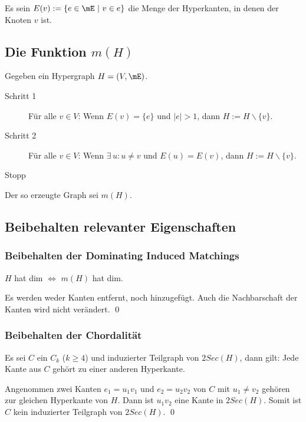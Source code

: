Es sein $E(v):=\{e\in \mE \ |\ v\in e\}$ die Menge der Hyperkanten, in denen der Knoten $v$ ist.

\subsection{Die Funktion $m(H)$}
Gegeben ein Hypergraph $H=(V,\mE)$.
\begin{description}
\item[Schritt 1] Für alle $v\in V$: Wenn $E(v)=\{e\}$ und $|e|>1$, dann $H:=H\backslash\{v\}$.

\item[Schritt 2] Für alle $v\in V$: Wenn $\exists\,u:u\neq v$ und $E(u)=E(v)$, dann $H:=H\backslash\{v\}$.

\item[Stopp]
\end{description}

Der so erzeugte Graph sei $m(H)$.

\subsection{Beibehalten relevanter Eigenschaften}
\subsubsection{Beibehalten der Dominating Induced Matchings}
\begin{Theorem}
$H$ hat dim $\Leftrightarrow$ $m(H)$ hat dim.
\end{Theorem}

\begin{Proof}
Es werden weder Kanten entfernt, noch hinzugefügt. Auch die Nachbarschaft der Kanten wird nicht verändert. \qed
\end{Proof}

\subsubsection{Beibehalten der Chordalität}

\begin{Lemma}\label{lem:JedeKanteAndereHyperkante}
Es sei $C$ ein $C_k$ ($k\geq 4$) und induzierter Teilgraph von $2Sec(H)$, dann gilt: Jede Kante aus $C$ gehört zu einer anderen Hyperkante.
\end{Lemma}

\begin{Proof}
Angenommen zwei Kanten $e_1=u_1v_1$ und $e_2=u_2v_2$ von $C$ mit $u_1\neq v_2$ gehören zur gleichen Hyperkante von $H$. Dann ist $u_1v_2$ eine Kante in $2Sec(H)$. Somit ist $C$ kein induzierter Teilgraph von $2Sec(H)$. \qed
\end{Proof}

